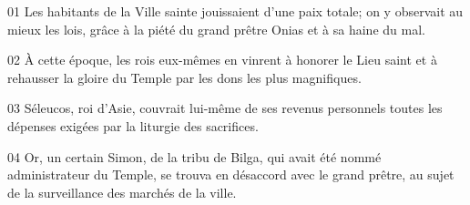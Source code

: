 01 Les habitants de la Ville sainte jouissaient d’une paix totale; on y observait au mieux les lois, grâce à la piété du grand prêtre Onias et à sa haine du mal.

02 À cette époque, les rois eux-mêmes en vinrent à honorer le Lieu saint et à rehausser la gloire du Temple par les dons les plus magnifiques.

03 Séleucos, roi d’Asie, couvrait lui-même de ses revenus personnels toutes les dépenses exigées par la liturgie des sacrifices.

04 Or, un certain Simon, de la tribu de Bilga, qui avait été nommé administrateur du Temple, se trouva en désaccord avec le grand prêtre, au sujet de la surveillance des marchés de la ville.
